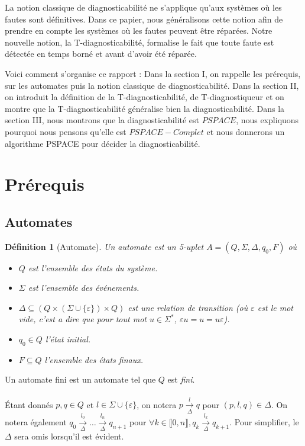 \documentclass[conference]{IEEEtran}
\newtheorem{mydef}{D\'efinition}
\newcommand{\enum}[2]{\llbracket #1, #2 \rrbracket}
\begin{document}
La notion classique de diagnosticabilit\'e\cite{SamSRST96} ne s'applique qu'aux systèmes où les fautes sont définitives. Dans ce papier, nous généralisons cette notion afin de prendre en compte les systèmes où les fautes peuvent être r\'eparées. Notre nouvelle notion, la T-diagnosticabilit\'e, formalise le fait que toute faute est détectée en temps born\'e et avant d'avoir été r\'epar\'ee.

Voici comment s'organise ce rapport : Dans la section I, on rappelle les prérequis, sur les automates puis la notion classique de diagnosticabilité. Dans la section II, on introduit la définition de la T-diagnosticabilit\'e, de T-diagnostiqueur et on montre que la T-diagnosticabilit\'e généralise bien la diagnosticabilité. Dans la section III, nous montrons que la diagnosticabilité est $PSPACE$, nous expliquons pourquoi nous pensons qu'elle est $PSPACE-Complet$ et nous donnerons un algorithme PSPACE pour décider la diagnosticabilité.

\section{Pr\'erequis}

\subsection{Automates}

\begin{mydef}[Automate]
Un automate est un 5-uplet $A = (Q, \Sigma, \Delta, q_0, F)$ o\`u
\begin{itemize}
	\item $Q$ est l'ensemble des états du système.
	\item $\Sigma$ est l'ensemble des événements.
	\item $\Delta \subseteq (Q \times (\Sigma \cup \{\varepsilon\}) \times Q)$ est une relation de transition (o\`u $\varepsilon$ est le mot vide, c'est a dire que pour tout mot $u\in\Sigma^*$, $\varepsilon u = u = u\varepsilon$).
	\item $q_0 \in Q$ l'état initial.
	\item $F \subseteq Q$ l'ensemble des \'etats finaux.
\end{itemize}
\end{mydef}

Un automate fini est un automate tel que $Q$ est \emph{fini}.
\paragraph{}
\'Etant donn\'es $p,q \in Q$ et $l\in \Sigma \cup \{\varepsilon\}$, on notera $p \underset{\Delta}{\overset{l}{{\to}}}q$ pour $(p,l,q) \in \Delta$. On notera \'egalement $q_0 \underset{\Delta}{\overset{l_0}{{\to}}} \dots \underset{\Delta}{\overset{l_n}{{\to}}} q_{n+1}$ pour $\forall k \in \enum{0}{n}, q_k 
\underset{\Delta}{\overset{l_k}{{\to}}} q_{k+1}$. Pour simplifier, le $\Delta$ sera omis lorsqu'il est \'evident.
\end{document}
